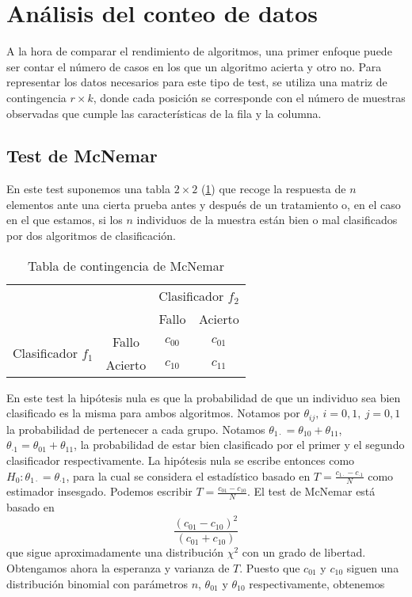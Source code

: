 \section{Análisis del conteo de datos}
	
	A la hora de comparar el rendimiento de algoritmos, una 
primer enfoque puede ser contar el número de casos en los que 
un algoritmo acierta y otro no. Para representar los datos 
necesarios para este tipo de test, se utiliza una matriz de 
contingencia $r \times k$, donde cada posición se corresponde 
con el número de muestras observadas que cumple las 
características de la fila y la columna.
	
\subsection{Test de McNemar}
	
	En este test suponemos una tabla $2 \times 2$ (\ref{Tb:McNemar}) que recoge 
la respuesta de $n$ elementos ante una cierta prueba antes y 
después de un tratamiento o, en el caso en el que estamos, si 
los $n$ individuos de la muestra están bien o mal 
clasificados por dos algoritmos de clasificación.
	
\begin{table}[H]
\centering
\caption{Tabla de contingencia de McNemar}
\label{Tb:McNemar}
\begin{tabular}{|lc|cc|}
\hline
                                                          &       & \multicolumn{2}{c|}{Clasificador $f_2$} \\ \cline{3-4} 
                                                          &         & Fallo              & Acierto            \\ \hline
\multicolumn{1}{|c|}{\multirow{2}{*}{Clasificador $f_1$}} & Fallo   & $c_{00}$           & $c_{01}$           \\
\multicolumn{1}{|c|}{}                                    & Acierto & $c_{10}$           & $c_{11}$           \\ \hline
\end{tabular}
\end{table}

	En este test la hipótesis nula es que la probabilidad de 
que un individuo sea bien clasificado es la misma para ambos 
algoritmos. Notamos por $\theta_{ij},\ i=0,1,\ j=0,1$ la 
probabilidad de pertenecer a cada grupo. Notamos 
$\theta_{1 \cdot} = \theta_{10} + \theta_{11}$, 
$\theta_{\cdot 1} = \theta_{01} + \theta_{11}$, la 
probabilidad de estar bien clasificado por el primer y el 
segundo clasificador respectivamente. La hipótesis nula se 
escribe entonces como $H_0: \theta_{1 \cdot} = 
\theta_{\cdot 1}$, para la cual se considera el estadístico 
basado en $T = \frac{c_{1 \cdot} - c_{\cdot 1}}{N}$ como 
estimador insesgado. Podemos escribir $T = \frac{c_{01} - 
c_{10}}{N}$. El test de McNemar está basado en
	\[ \frac{(c_{01} - c_{10})^2}{(c_{01} + c_{10})} \]
	que sigue aproximadamente una distribución $\chi^2$ con 
un grado de libertad. Obtengamos ahora la esperanza y 
varianza de $T$. Puesto que $c_{01}$ y $c_{10}$ siguen una 
distribución binomial con parámetros $n$, $\theta_{01}$ y 
$\theta_{10}$ respectivamente, obtenemos

